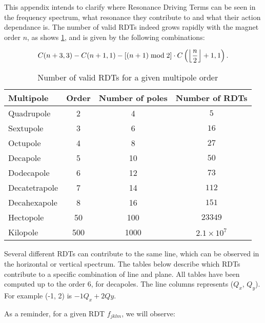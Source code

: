 This appendix intends to clarify where Resonance Driving Terms can be seen in the frequency
spectrum, what resonance they contribute to and what their action dependance is.  
The number of valid RDTs indeed grows rapidly with the magnet order $n$, as shows
\cref{table:appendix:number_rdts}, and is given by the following combinations:

\begin{equation}
    C(n+3, 3) - C(n+1,1) - \left[(n+1) \;\mathrm{mod}\; 2\right] \cdot C\left(\floor*{\frac{n}{2}}+1, 1\right).
    \label{eq:number_rdts}
\end{equation}

\begin{table}[H]
  \centering
  \begin{tabular}{lccc}
  Multipole     & Order & Number of poles & Number of RDTs             \\
  \hline
  Quadrupole    & 2     & 4    & $5  $                                 \\ 
  Sextupole     & 3     & 6    & $16  $                                \\ 
  Octupole      & 4     & 8    & $27  $                                \\ 
  Decapole      & 5     & 10   & $50  $                                \\ 
  Dodecapole    & 6     & 12   & $73  $                                \\ 
  Decatetrapole & 7     & 14   & $112  $                               \\ 
  Decahexapole  & 8     & 16   & $151  $                               \\ 
  Hectopole     & 50    & 100  & $23349  $                             \\
  Kilopole      & 500   & 1000 & $2.1 \times 10^7$ \\ \hline
  \end{tabular}
  \caption{Number of valid RDTs for a given multipole order}
  \label{table:appendix:number_rdts}
\end{table}


Several different RDTs can contribute to the same line, which can be observed in the horizontal or vertical spectrum. The tables below describe which RDTs contribute to a specific combination of line and plane.
All tables have been computed up to the order 6, for decapoles.
The line columns represents ($Q_x$, $Q_y$). For example (-1, 2) is \(-1Q_x + 2Qy\).

As a reminder, for a given RDT $f_{jklm}$, we will observe:

